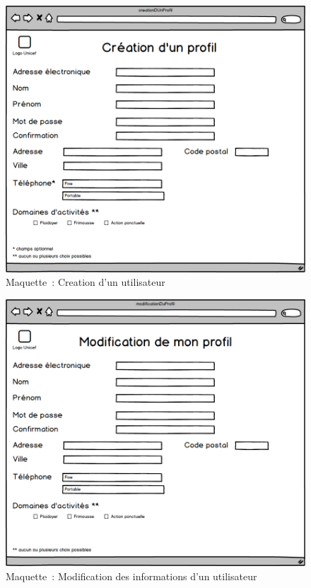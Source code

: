 \begin{figure}[H]
	\centering
	\includegraphics[scale=0.4]{images/creationDUnProfil.png}
	 \caption{Maquette~: Creation d'un utilisateur}
	 \label{creationDUnUtilisateurs}
\end{figure}

\begin{figure}[H]
	\centering
	\includegraphics[scale=0.4]{images/modificationDUnProfil.png}
	 \caption{Maquette~: Modification des informations d'un utilisateur}
	 \label{modificationDUnProfil}
\end{figure}


